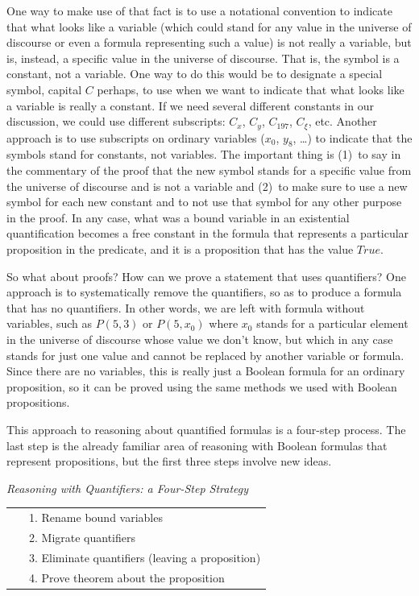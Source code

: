 {{One way to make use of that fact is to use a notational convention
to indicate that what looks like a variable (which could stand for any
value in the universe of discourse or even a formula representing such a value)
is not really a variable, but is, instead, a specific value in the universe of
discourse. That is, the symbol is a constant, not a variable.
One way to do this would be to designate a special symbol, capital $C$ perhaps,
to use when we want to indicate that what looks like a variable is really a constant.
\label{def:skolem-constant}
If we need several different constants in our discussion, we could use different
subscripts: $C_x$, $C_y$, $C_{197}$, $C_{\xi}$, etc.
Another approach is to use subscripts on ordinary variables ($x_0$, $y_8$, \dots)
to indicate that the symbols stand for constants, not variables.
The important thing is (1)~to say in the commentary of the proof that the new
symbol stands for a specific value from the universe of discourse and is not a variable
and (2)~to make sure to use a new symbol for each new constant and to not use that
symbol for any other purpose in the proof.
In any case, what was a bound variable
in an existential quantification
becomes a free constant in the formula that represents a particular proposition in the
predicate, and it is a proposition that has the value $True$.

So what about proofs? How can we prove a statement that uses quantifiers?
One approach is to systematically
remove the quantifiers, so as to produce a formula that has no quantifiers.
In other words, we
are left with formula without variables, such as $P(5,3)$ or $P(5,x_0)$ where
$x_0$ stands for a particular element in the universe of discourse whose value
we don't know, but which in any case stands for just one value and cannot
be replaced by another variable or formula.
Since there are no variables, this is really just a Boolean formula
for an ordinary proposition,
so it can be proved using the same methods we used
with Boolean propositions.

This approach to reasoning about quantified formulas is a four-step process.
The last step is the already familiar area of reasoning
with Boolean formulas that represent propositions,
but the first three steps involve new ideas.

\begin{center}
\emph{Reasoning with Quantifiers: a Four-Step Strategy}\\
\begin{tabular} {ll}
\hline
~&1. Rename bound variables \\
~&2. Migrate quantifiers \\
~&3. Eliminate quantifiers (leaving a proposition) \\
~&4. Prove theorem about the proposition \\
\end{tabular}
\label{four-step-strategy-quantifiers}
\end{center}

}}
